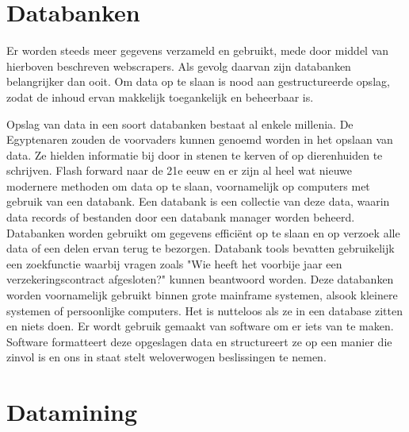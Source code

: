 \section{Databanken}

Er worden steeds meer gegevens verzameld en gebruikt, mede door middel van hierboven beschreven webscrapers. Als gevolg daarvan zijn databanken belangrijker dan ooit.
Om  data op te slaan is nood aan gestructureerde opslag, zodat de inhoud ervan makkelijk toegankelijk en beheerbaar is. 

Opslag van data in een soort databanken bestaat al enkele millenia. De Egyptenaren zouden de voorvaders kunnen genoemd worden in het opslaan van data. Ze hielden informatie bij door in stenen te kerven of op dierenhuiden te schrijven. Flash forward naar de 21e eeuw en er zijn al heel wat nieuwe modernere methoden om data op te slaan, voornamelijk op computers met gebruik van een databank.
Een databank is een collectie van deze data, waarin data records of bestanden door een databank manager worden beheerd. \autocite{obenshain_2004} Databanken worden gebruikt om gegevens efficiënt op te slaan en op verzoek alle data of een delen ervan terug te bezorgen. Databank tools bevatten gebruikelijk een zoekfunctie waarbij vragen zoals "Wie heeft het voorbije jaar een verzekeringscontract afgesloten?" kunnen beantwoord worden. Deze databanken worden voornamelijk gebruikt binnen grote mainframe systemen, alsook kleinere systemen of persoonlijke computers. Het is nutteloos als ze in een database zitten en niets doen. Er wordt gebruik gemaakt van software om er iets van te maken. Software formatteert deze opgeslagen data en structureert ze op een manier die zinvol is en ons in staat stelt weloverwogen beslissingen te nemen.


\section{Datamining}

